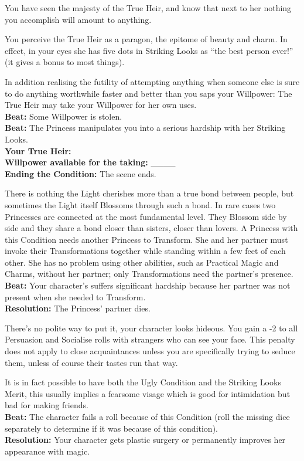 \documentclass[10pt, frontgrid, backgrid]{flacards}
\begin{document}
{You have seen the majesty of the True Heir, and know that next to her nothing you accomplish will amount to anything. 

You perceive the True Heir as a paragon, the epitome of beauty and charm. In effect, in your eyes she has five dots in Striking Looks as \textquotedblleft the best person ever!\textquotedblright\, (it gives a bonus to most things). 

In addition realising the futility of attempting anything when someone else is sure to do anything worthwhile faster and better than you saps your Willpower: The True Heir may take your Willpower for her own uses. \\

\textbf{Beat:} Some Willpower is stolen.\\
\textbf{Beat:} The Princess manipulates you into a serious hardship with her Striking Looks.\\
\textbf{Your True Heir:} \fillunderline \\
\textbf{Willpower available for the taking:} \_\_\_\_\\
\textbf{Ending the Condition:} The scene ends.}



{There is nothing the Light cherishes more than a true bond between people, but sometimes the Light itself Blossoms through such a bond. In rare cases two Princesses are connected at the most fundamental level. They Blossom side by side and they share a bond closer than sisters, closer than lovers. A Princess with this Condition needs another Princess to Transform. She and her partner must invoke their Transformations together while standing within a few feet of each other. She has no problem using other abilities, such as Practical Magic and Charms, without her partner; only Transformations need the partner's presence. \\
\textbf{Beat:} Your character's suffers significant hardship because her partner was not present when she needed to Transform.\\
\textbf{Resolution:} The Princess' partner dies.}

{There's no polite way to put it, your character looks hideous. You gain a -2 to all Persuasion and Socialise rolls with strangers who can see your face. This penalty does not apply to close acquaintances unless you are specifically trying to seduce them, unless of course their tastes run that way. 

It is in fact possible to have both the Ugly Condition and the Striking Looks Merit, this usually implies a fearsome visage which is good for intimidation but bad for making friends. \\
\textbf{Beat:} The character fails a roll because of this Condition (roll the missing dice separately to determine if it was because of this condition).\\
\textbf{Resolution:} Your character gets plastic surgery or permanently improves her appearance with magic.}
\end{document}
